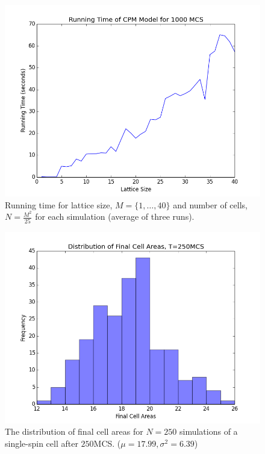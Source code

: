 \documentclass[12pt]{article}
\begin{document}
\begin{figure}[H]
	\centering
	\includegraphics[scale=0.5]{img/runningtime}
	\caption{Running time for lattice size, $M =\{1,\ldots, 40\}$ and number of cells, $N=\frac{M^2}{25}$ for each simulation (average of three runs).}
	\label{runningtime}
\end{figure}

\pagebreak

\begin{figure}[H]
	\centering
	\includegraphics[scale=0.5]{img/cellareas}
	\caption{The distribution of final cell areas for $N=250$ simulations of a single-spin cell after $250$MCS. ($\mu = 17.99, \sigma^2=6.39$) }
	\label{cellareas}
\end{figure}
\end{document}
